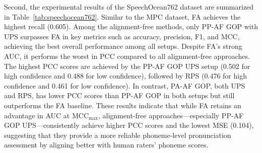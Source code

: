 \documentclass{Interspeech}
\begin{document}

Second, the experimental results of the SpeechOcean762 dataset are summarized in Table~\ref{tab:speechocean762}. Similar to the MPC dataset, FA achieves the highest recall (0.605). Among the alignment-free methods, only PP-AF GOP with UPS surpasses FA in key metrics such as accuracy, precision, F1, and MCC, achieving the best overall performance among all setups. Despite FA's strong AUC, it performs the worst in PCC compared to all alignment-free approaches. The highest PCC scores are achieved by the PP-AF GOP UPS setup (0.502 for high confidence and 0.488 for low confidence), followed by RPS (0.476 for high confidence and 0.461 for low confidence). In contrast, PA-AF GOP, both UPS and RPS, has lower PCC scores than PP-AF GOP in both setups but still outperforms the FA baseline. These results indicate that while FA retains an advantage in AUC at MCC$_{\max}$, alignment-free approaches—especially PP-AF GOP UPS—consistently achieve higher PCC scores and the lowest MSE (0.104), suggesting that they provide a more reliable phoneme-level pronunciation assessment by aligning better with human raters' phoneme scores.
\end{document}

